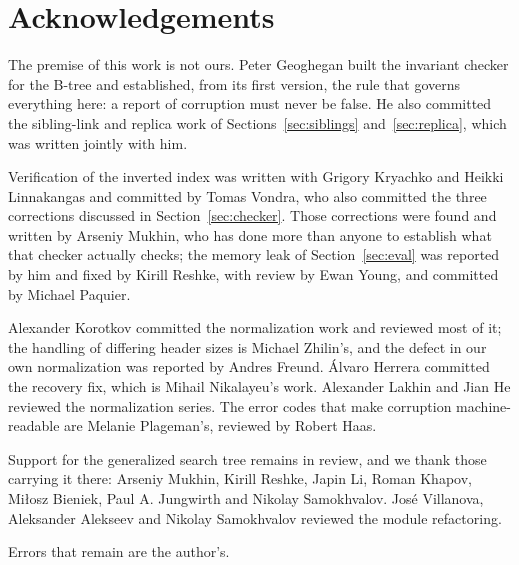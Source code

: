 \documentclass[11pt, a4paper]{article}
\begin{document}


\section*{Acknowledgements}


The premise of this work is not ours. Peter Geoghegan built the invariant
checker for the B-tree and established, from its first version, the rule that
governs everything here: a report of corruption must never be false. He also
committed the sibling-link and replica work of Sections~\ref{sec:siblings}
and~\ref{sec:replica}, which was written jointly with him.

Verification of the inverted index was written with Grigory Kryachko and Heikki
Linnakangas and committed by Tomas Vondra, who also committed the three
corrections discussed in Section~\ref{sec:checker}. Those corrections were found
and written by Arseniy Mukhin, who has done more than anyone to establish what
that checker actually checks; the memory leak of Section~\ref{sec:eval} was
reported by him and fixed by Kirill Reshke, with review by Ewan Young, and
committed by Michael Paquier.

Alexander Korotkov committed the normalization work and reviewed most of it;
the handling of differing header sizes is Michael Zhilin's, and the defect in
our own normalization was reported by Andres Freund. Álvaro Herrera committed
the recovery fix, which is Mihail Nikalayeu's work. Alexander Lakhin and Jian He
reviewed the normalization series. The error codes that make corruption
machine-readable are Melanie Plageman's, reviewed by Robert Haas.

Support for the generalized search tree remains in review, and we thank those
carrying it there: Arseniy Mukhin, Kirill Reshke, Japin Li, Roman Khapov,
Miłosz Bieniek, Paul A. Jungwirth and Nikolay Samokhvalov. José Villanova,
Aleksander Alekseev and Nikolay Samokhvalov reviewed the module refactoring.

Errors that remain are the author's.



\end{document}
